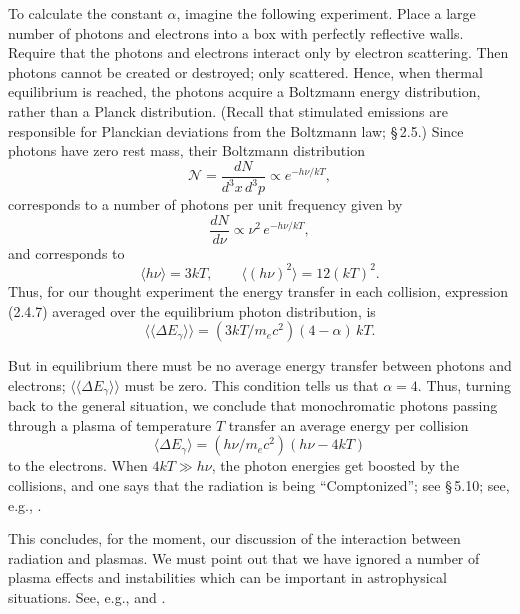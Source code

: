To calculate the constant $\alpha$, imagine the following experiment.  Place a large
number of photons and electrons into a box with perfectly reflective walls.
Require that the photons and electrons interact only by electron scattering.  Then
photons cannot be created or destroyed; only scattered.  Hence, when thermal
equilibrium is reached, the photons acquire a Boltzmann energy distribution,
rather than a Planck distribution.  (Recall that stimulated emissions are responsible
for Planckian deviations from the Boltzmann law; \S\,2.5.)  Since photons have
zero rest mass, their Boltzmann distribution
\begin{equation}
\mathscr{N} = \frac{dN}{d^3 x\,d^3 p} \propto e^{-h\nu/kT},
\tag*{}
\end{equation}
corresponds to a number of photons per unit frequency given by
\begin{equation}
\frac{dN}{d\nu} \propto \nu^2\,e^{-h\nu/kT},
\tag{2.4.8}
\end{equation}
and corresponds to
\begin{equation}
\langle h\nu\rangle = 3kT, \qquad
\langle (h\nu)^2\rangle = 12(kT)^2.
\tag*{}
\end{equation}
Thus, for our thought experiment the energy transfer in each collision, expression
(2.4.7) averaged over the equilibrium photon distribution, is
\begin{equation}
\langle\langle\Delta E_\gamma\rangle\rangle = (3kT/m_e c^2)(4-\alpha)\,kT.
\tag*{}
\end{equation}

But in equilibrium there must be no average energy transfer between photons
and electrons; $\langle\langle\Delta E_\gamma\rangle\rangle$ must be zero.
This condition tells us that $\alpha = 4$.
Thus, turning back to the general situation, we conclude that monochromatic
photons passing through a plasma of temperature $T$ transfer an average energy
per collision
\begin{equation}
\langle\Delta E_\gamma\rangle = (h\nu/m_e c^2)(h\nu - 4kT)
\tag{2.4.9}
\end{equation}
to the electrons.  When $4kT \gg h\nu$, the photon energies get boosted by the
collisions, and one says that the radiation is being ``Comptonized''; see \S\,5.10;
see, e.g., \citet{Illarionov1972}.

This concludes, for the moment, our discussion of the interaction between
radiation and plasmas.  We must point out that we have ignored a number of
plasma effects and instabilities which can be important in astrophysical
situations.  See, e.g., \citet{Bekefi1966} and \citet{KaplanTsytovich1972}.

